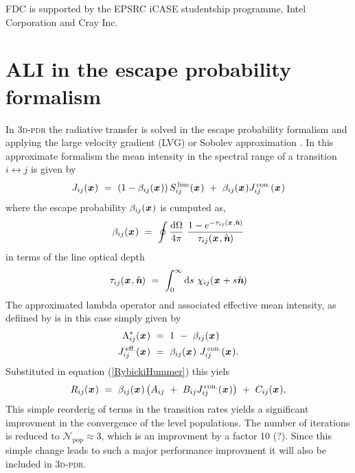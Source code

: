 \documentclass[a4paper,fleqn,usenatbib]{mnras}
\newcommand{\D}{\text{d}}
\newcommand{\x}{{\textit{\textbf{x}}}\,}
\newcommand{\n}{\hat{\textit{\textbf{n}}}}
\begin{document}
FDC is supported by the EPSRC iCASE studentship programme, Intel Corporation and Cray Inc.










\appendix




\section{ALI in the escape probability formalism}
\label{Sobolev}

In \textsc{3d-pdr} the radiative transfer is solved in the escape probability formalism and applying the large velocity gradient (LVG) or Sobolev approximation \citep{Sobolev1960, Castor1970, deJong1975, Poelman2005}. In this approximate formalism the mean intensity in the spectral range of a transition $i \leftrightarrow j$ is given by
\begin{equation}
J_{ij}(\x) \ = \ \left(1-\beta_{ij}(\x)\right) S^{\,\text{line}}_{ij}(\x) \ + \ \beta_{ij}(\x) J^{\,\text{con.}}_{ij}(\x)
\end{equation}
where the escape probability $\beta_{ij}(\x)$ is cumputed as,
\begin{equation}
	\beta_{ij}(\x) \ = \ \oint \frac{\D \Omega}{4\pi} \ \frac{1-e^{-\tau_{ij}(\x,\n)}}{\tau_{ij}(\x,\n)}
\end{equation}
in terms of the line optical depth
\begin{equation}
	\tau_{ij}(\x,\n) \ = \ \int_{0}^{\infty} \D s \ \chi_{ij}(\x+s\n)
\end{equation}
The approximated lambda operator and associated effective mean intensity, as defiined by \citet{Rybicki1991} is in this case simply given by
\begin{equation}
\begin{split}
	\Lambda^{\ast}_{ij}(\x) \ &= \ 1 \ - \ \beta_{ij}(\x) \\
	J^{\,\text{eff.}}_{ij}(\x) \ &= \ \beta_{ij}(\x) \ J^{\,\text{con.}}_{ij}(\x).
\end{split}
\end{equation}
Substituted in equation (\ref{RybickiHummer}) this yiels
\begin{equation}
	R_{ij}(\x) \ = \  \beta_{ij}(\x) \left( A_{ij} \ + \ B_{ij} J^{\,\text{con.}}_{ij}(\x) \right) \ + \ C_{ij}(\x),
\end{equation}
This simple reorderig of terms in the transition rates yields a significant improvment in the convergence of the level populations. The number of iterations is reduced to $\mathcal{N}_{\text{pop}} \approx 3$, which is an improvment by a factor 10 (?). Since this simple change leads to such a major performance improvment it will also be included in \textsc{3d-pdr}.
\end{document}
